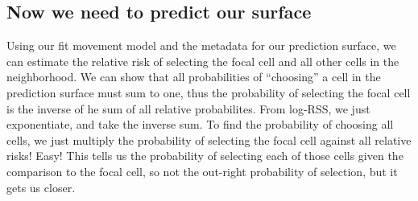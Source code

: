 \documentclass[
]{article}
\newenvironment{Shaded}{\begin{snugshade}}{\end{snugshade}}
\newcommand{\AttributeTok}[1]{\textcolor[rgb]{0.77,0.63,0.00}{#1}}
\newcommand{\CommentTok}[1]{\textcolor[rgb]{0.56,0.35,0.01}{\textit{#1}}}
\newcommand{\ControlFlowTok}[1]{\textcolor[rgb]{0.13,0.29,0.53}{\textbf{#1}}}
\newcommand{\DecValTok}[1]{\textcolor[rgb]{0.00,0.00,0.81}{#1}}
\newcommand{\FunctionTok}[1]{\textcolor[rgb]{0.00,0.00,0.00}{#1}}
\newcommand{\NormalTok}[1]{#1}
\newcommand{\OtherTok}[1]{\textcolor[rgb]{0.56,0.35,0.01}{#1}}
\newcommand{\SpecialCharTok}[1]{\textcolor[rgb]{0.00,0.00,0.00}{#1}}
\begin{document}
\begin{Shaded}
\end{Shaded}

\hypertarget{now-we-need-to-predict-our-surface}{%
\subsection{Now we need to predict our
surface}\label{now-we-need-to-predict-our-surface}}

Using our fit movement model and the metadata for our prediction
surface, we can estimate the relative risk of selecting the focal cell
and all other cells in the neighborhood. We can show that all
probabilities of ``choosing'' a cell in the prediction surface must sum
to one, thus the probability of selecting the focal cell is the inverse
of he sum of all relative probabilites. From log-RSS, we just
exponentiate, and take the inverse sum. To find the probability of
choosing all cells, we just multiply the probability of selecting the
focal cell against all relative risks! Easy! This tells us the
probability of selecting each of those cells given the comparison to the
focal cell, so not the out-right probability of selection, but it gets
us closer.
\end{document}
